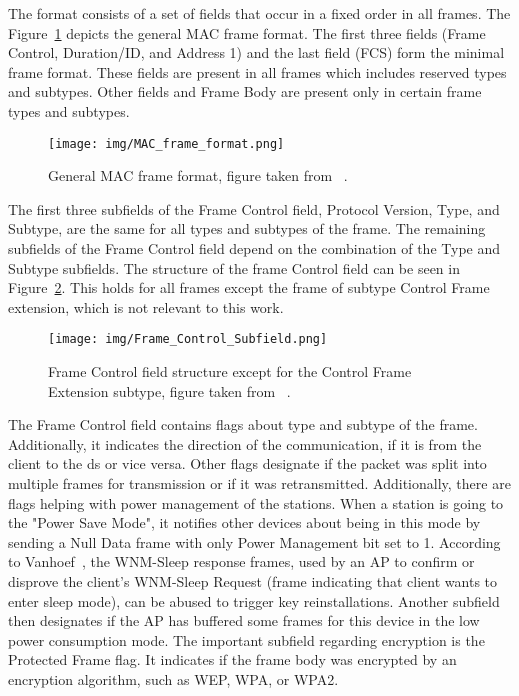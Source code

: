 The format consists of a set of fields that occur in a fixed order in all frames. The Figure~\ref{fig:frameFormat} depicts the general MAC frame format. The first three fields (Frame Control, Duration/ID, and Address 1) and the last field (FCS) form the minimal frame format. These fields are present in all frames which includes reserved types and subtypes. Other fields and Frame Body are present only in certain frame types and subtypes.

\begin{figure}[h!]
  \centering
  \texttt{[image: img/MAC\_frame\_format.png]}
  \caption[General MAC frame format]{General MAC frame format, figure taken from ~\cite{revision2016}.}
  \label{fig:frameFormat}
\end{figure}

The first three subfields of the Frame Control field, Protocol Version, Type, and Subtype, are the same for all types and subtypes of the frame. The remaining subfields of the Frame Control field depend on the combination of the Type and Subtype subfields. The structure of the frame Control field can be seen in Figure~\ref{fig:frameControl}. This holds for all frames except the frame of subtype Control Frame extension, which is not relevant to this work.

\begin{figure}[h!]
  \centering
  \texttt{[image: img/Frame\_Control\_Subfield.png]}
  \caption[Frame Control field structure]{Frame Control field structure except for the Control Frame Extension subtype, figure taken from ~\cite{revision2016}.}
  \label{fig:frameControl}
\end{figure}

The Frame Control field contains flags about type and subtype of the frame. Additionally, it indicates the direction of the communication, if it is from the client to the \gls{ds} or vice versa. Other flags designate if the packet was split into multiple frames for transmission or if it was retransmitted. Additionally, there are flags helping with power management of the stations. When a station is going to the "Power Save Mode", it notifies other devices about being in this mode by sending a Null Data frame with only Power Management bit set to 1. According to Vanhoef~\cite{VA18}, the WNM-Sleep response frames, used by an AP to confirm or disprove the client's WNM-Sleep Request (frame indicating that client wants to enter sleep mode), can be abused to trigger key reinstallations. Another subfield then designates if the AP has buffered some frames for this device in the low power consumption mode. The important subfield regarding encryption is the Protected Frame flag. It indicates if the frame body was encrypted by an encryption algorithm, such as WEP, WPA, or WPA2.

